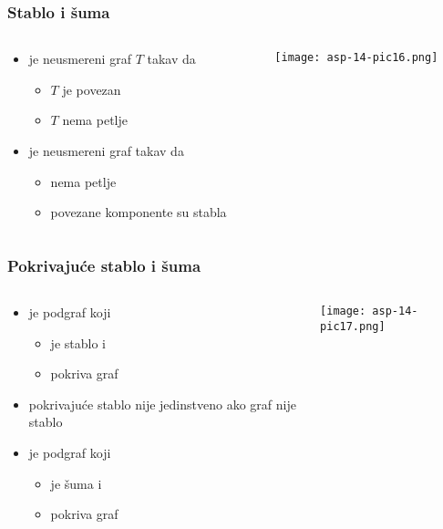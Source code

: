 \documentclass[compress,aspectratio=169]{beamer}
\begin{document}
\begin{frame}[fragile]
  \frametitle{Stablo i šuma}
  \begin{columns}
    \begin{column}[t]{6cm}
      \begin{itemize}
        \item {} je neusmereni graf $T$ takav da
        \begin{itemize}
          \item $T$ je povezan
          \item $T$ nema petlje
        \end{itemize}
        \item {} je neusmereni graf takav da
        \begin{itemize}
          \item nema petlje
          \item povezane komponente su stabla
        \end{itemize}
      \end{itemize}
    \end{column}
    \begin{column}[t]{6cm}
      \begin{center}
        \texttt{[image: asp-14-pic16.png]}
      \end{center}
    \end{column}
  \end{columns}
\end{frame}

\begin{frame}[fragile]
  \frametitle{Pokrivajuće stablo i šuma}
  \begin{columns}
    \begin{column}[t]{6cm}
      \begin{itemize}
        \item {} je podgraf koji
        \begin{itemize}
          \item je stablo i
          \item pokriva graf
        \end{itemize}
        \item pokrivajuće stablo nije jedinstveno ako graf nije stablo
        \item {} je podgraf koji
        \begin{itemize}
          \item je šuma i
          \item pokriva graf
        \end{itemize}
      \end{itemize}
    \end{column}
    \begin{column}[t]{6cm}
      \begin{center}
        \texttt{[image: asp-14-pic17.png]}
      \end{center}
    \end{column}
  \end{columns}
\end{frame}
\end{document}
